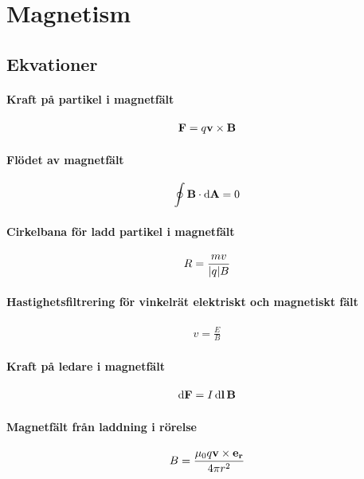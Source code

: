 \section{Magnetism}

\subsection{Ekvationer}

\paragraph{Kraft på partikel i magnetfält}
\begin{align*}
	\vect{F} = q\vect{v}\times\vect{B}
\end{align*}

\paragraph{Flödet av magnetfält}
\begin{align*}
	\oint\vect{B}\cdot\dd{\vect{A}} = 0
\end{align*}

\paragraph{Cirkelbana för ladd partikel i magnetfält}
\begin{align*}
	R = \frac{mv}{\abs{q}B}
\end{align*}

\paragraph{Hastighetsfiltrering för vinkelrät elektriskt och magnetiskt fält}
\begin{align*}
	v = \frac{E}{B}
\end{align*}

\paragraph{Kraft på ledare i magnetfält}
\begin{align*}
	\dd{\vect{F}} = I\dd{\vect{l}}\vect{B}
\end{align*}

\paragraph{Magnetfält från laddning i rörelse}
\begin{align*}
	B = \frac{\mu_0q\vect{v}\times\vect{e}_{\vect{r}}}{4\pi r^2}
\end{align*}

